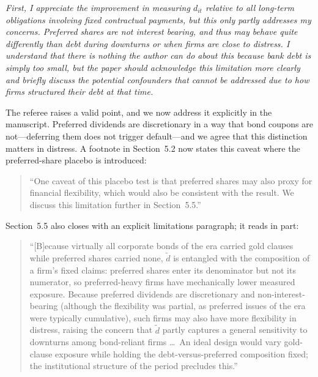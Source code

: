 \noindent \textit{\textcolor{red!60!black}{
First, I appreciate the improvement in measuring $d_{it}$ relative to all long-term obligations involving fixed contractual payments, but this only partly addresses my concerns. Preferred shares are not interest bearing, and thus may behave quite differently than debt during downturns or when firms are close to distress. I understand that there is nothing the author can do about this because bank debt is simply too small, but the paper should acknowledge this limitation more clearly and briefly discuss the potential confounders that cannot be addressed due to how firms structured their debt at that time.
}}

\bigskip

\noindent The referee raises a valid point, and we now address it explicitly in the manuscript. Preferred dividends are discretionary in a way that bond coupons are not---deferring them does not trigger default---and we agree that this distinction matters in distress. A footnote in Section~5.2 now states this caveat where the preferred-share placebo is introduced:

\begin{quote}
``One caveat of this placebo test is that preferred shares may also proxy for financial flexibility, which would also be consistent with the result. We discuss this limitation further in Section~5.5.''
\end{quote}

\medskip
\noindent Section~5.5 also closes with an explicit limitations paragraph; it reads in part:

\begin{quote}
``[B]ecause virtually all corporate bonds of the era carried gold clauses while preferred shares carried none, $\tilde{d}$ is entangled with the composition of a firm's fixed claims: preferred shares enter its denominator but not its numerator, so preferred-heavy firms have mechanically lower measured exposure. Because preferred dividends are discretionary and non-interest-bearing (although the flexibility was partial, as preferred issues of the era were typically cumulative), such firms may also have more flexibility in distress, raising the concern that $\tilde{d}$ partly captures a general sensitivity to downturns among bond-reliant firms \ldots\ An ideal design would vary gold-clause exposure while holding the debt-versus-preferred composition fixed; the institutional structure of the period precludes this.''
\end{quote}
